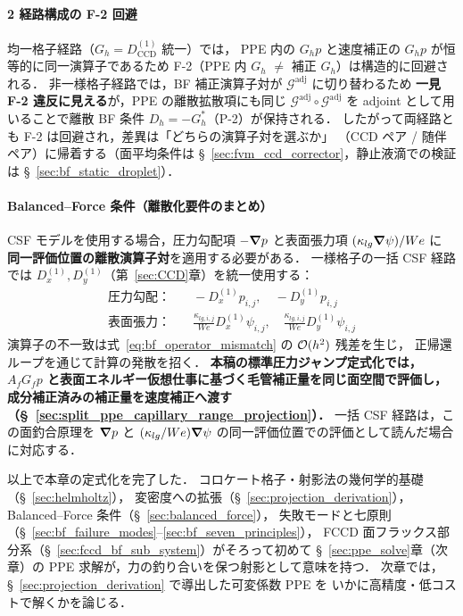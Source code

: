 \paragraph{2 経路構成の F-2 回避}
均一格子経路（$G_h = D^{(1)}_\mathrm{CCD}$ 統一）では，
PPE 内の $G_h p$ と速度補正の $G_h p$ が恒等的に同一演算子であるため
F-2（PPE 内 $G_h$ $\neq$ 補正 $G_h$）は構造的に回避される．
非一様格子経路では，BF 補正演算子対が $\mathcal{G}^\text{adj}$ に切り替わるため
\textbf{一見 F-2 違反に見える}が，PPE の離散拡散項にも同じ $\mathcal{G}^\text{adj}\circ\mathcal{G}^\text{adj}$
を adjoint として用いることで離散 BF 条件 $D_h = -G_h^\ast$（P-2）が保持される．
したがって両経路とも F-2 は回避され，差異は「どちらの演算子対を選ぶか」
（CCD ペア / 随伴ペア）に帰着する（面平均条件は §~\ref{sec:fvm_ccd_corrector}，静止液滴での検証は §~\ref{sec:bf_static_droplet}）．

\paragraph{Balanced--Force 条件（離散化要件のまとめ）}
CSF モデルを使用する場合，圧力勾配項 $-\bm{\nabla} p$ と表面張力項 $(\kappa_{lg}\bm{\nabla}\psi)/We$ に
\textbf{同一評価位置の離散演算子対}を適用する必要がある．
一様格子の一括 CSF 経路では $D_x^{(1)}, D_y^{(1)}$（第~\ref{sec:CCD}章）を統一使用する：
\begin{align}
  \text{圧力勾配：} & \quad
    -D_x^{(1)} p_{i,j}, \quad -D_y^{(1)} p_{i,j}
    \label{eq:balanced_pressure} \\
  \text{表面張力：} & \quad
    \frac{\kappa_{lg,i,j}}{We} D_x^{(1)} \psi_{i,j}, \quad
    \frac{\kappa_{lg,i,j}}{We} D_y^{(1)} \psi_{i,j}
    \label{eq:balanced_surface}
\end{align}
演算子の不一致は式~\eqref{eq:bf_operator_mismatch} の $\mathcal{O}(h^2)$ 残差を生じ，
正帰還ループを通じて計算の発散を招く．
\textbf{本稿の標準圧力ジャンプ定式化では，
$A_f G_f p$ と表面エネルギー仮想仕事に基づく毛管補正量を同じ面空間で評価し，
成分補正済みの補正量を速度補正へ渡す
（§~\ref{sec:split_ppe_capillary_range_projection}）．}
一括 CSF 経路は，この面釣合原理を
$\bm{\nabla} p$ と $(\kappa_{lg}/We)\bm{\nabla}\psi$ の同一評価位置での評価として読んだ場合に対応する．





\medskip
以上で本章の定式化を完了した．
コロケート格子・射影法の幾何学的基礎（§~\ref{sec:helmholtz}），
変密度への拡張（§~\ref{sec:projection_derivation}），
Balanced--Force 条件（§~\ref{sec:balanced_force}），
失敗モードと七原則（§~\ref{sec:bf_failure_modes}--\ref{sec:bf_seven_principles}），
FCCD 面フラックス部分系（§~\ref{sec:fccd_bf_sub_system}）がそろって初めて
§~\ref{sec:ppe_solve}章（次章）の PPE 求解が，力の釣り合いを保つ射影として意味を持つ．
次章では，§~\ref{sec:projection_derivation} で導出した可変係数 PPE を
いかに高精度・低コストで解くかを論じる．
